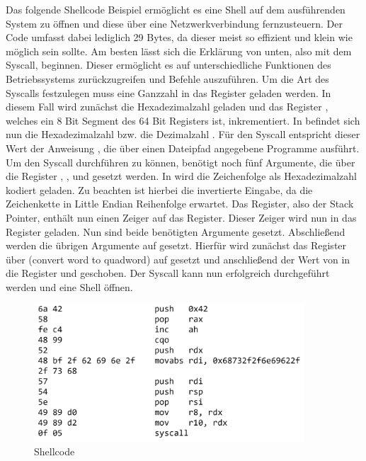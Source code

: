 Das folgende Shellcode Beispiel ermöglicht es eine Shell auf dem ausführenden System zu öffnen und diese über eine Netzwerkverbindung fernzusteuern. 
Der Code umfasst dabei lediglich 29 Bytes, da dieser meist so effizient und klein wie möglich sein sollte. 
Am besten lässt sich die Erklärung von unten, also mit dem Syscall, beginnen. 
Dieser ermöglicht es auf unterschiedliche Funktionen des Betriebssystems zurückzugreifen und Befehle auszuführen. 
Um die Art des Syscalls festzulegen muss eine Ganzzahl in das Register  geladen werden. 
In diesem Fall wird zunächst die Hexadezimalzahl  geladen und das Register , 
welches ein 8 Bit Segment des 64 Bit  Registers ist, inkrementiert. 
In  befindet sich nun die Hexadezimalzahl  bzw. die Dezimalzahl . 
Für den Syscall entspricht dieser Wert der Anweisung , 
die über einen Dateipfad angegebene Programme ausführt. Um den Syscall durchführen zu können, benötigt  noch fünf Argumente, 
die über die Register , ,  und  gesetzt werden. 
In  wird die Zeichenfolge  als Hexadezimalzahl kodiert geladen. 
Zu beachten ist hierbei die invertierte Eingabe, da  die Zeichenkette in Little Endian Reihenfolge erwartet. Das  Register, 
also der Stack Pointer, 
enthält nun einen Zeiger auf das  Register. Dieser Zeiger wird nun in das  Register geladen. Nun sind beide benötigten Argumente gesetzt. 
Abschließend werden die übrigen Argumente auf  gesetzt. Hierfür wird zunächst das  Register 
über  (convert word to quadword) auf  gesetzt und
anschließend der Wert von  in die Register  und  geschoben. 
Der Syscall kann nun erfolgreich durchgeführt werden und eine Shell öffnen. \cite{syscalls} \cite{execman}

\begin{figure}[h]
    \centering
    \includegraphics[width=0.9\textwidth,height=0.75\textheight,keepaspectratio]{images/shellstorm.png}
    \caption{Shellcode}
\end{figure}
\cite{shellstorm}


